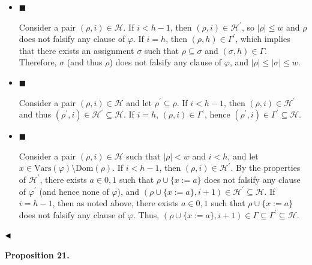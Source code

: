 \documentclass[10pt,a4paper]{article}
\begin{document}
\begin{itemize}


\item 
$\blacksquare$ 


Consider a pair $(\rho,i)\in\mathcal{H}$.
If $i<h-1$, then $(\rho,i)\in\mathcal{H^{\prime}}$, so $|\rho|\leq w$ and $\rho$ does not falsify any clause of $\varphi$.
If $i=h$, then $(\rho,h)\in\Gamma^{\prime}$, which implies that there exists an assignment $\sigma$ such that
$\rho\subseteq\sigma$ and $(\sigma,h)\in\Gamma$.
Therefore, $\sigma$ (and thus $\rho$) does not falsify any clause of $\varphi$, and $|\rho|\leq|\sigma|\leq w$.\par





\item 
$\blacksquare$ 


Consider a pair $(\rho,i)\in\mathcal{H}$ and let $\rho^{\prime}\subseteq\rho$.
If $i<h-1$, then $(\rho,i)\in\mathcal{H^{\prime}}$ and thus $(\rho^{\prime},i)\in\mathcal{H^{\prime}}\subseteq\mathcal{H}$.
If $i=h$, $(\rho,i)\in\Gamma^{\prime}$, hence $(\rho^{\prime},i)\in\Gamma^{\prime}\subseteq\mathcal{H}$.\par





\item 
$\blacksquare$ 


Consider a pair $(\rho,i)\in\mathcal{H}$ such that $|\rho|<w$ and $i<h$, and let $x\in\mathrm{Vars}(\varphi)\setminus\mathrm{Dom}(\rho)$.
If $i<h-1$, then $(\rho,i)\in\mathcal{H^{\prime}}$.
By the properties of $\mathcal{H^{\prime}}$, there exists $a\in{0,1}$ such that $\rho\cup\{x:=a\}$ does not falsify any clause
of $\varphi^{\prime}$ (and hence none of $\varphi$), and $(\rho\cup\{x:=a\},i+1)\in\mathcal{H^{\prime}}\subseteq\mathcal{H}$.
If $i=h-1$, then as noted above, there exists $a\in{0,1}$ such that $\rho\cup\{x:=a\}$ does not falsify any clause
of $\varphi$.
Thus, $(\rho\cup\{x:=a\},i+1)\in\Gamma\subseteq\Gamma^{\prime}\subseteq\mathcal{H}$.\par





\end{itemize}


$\hfill\blacktriangleleft$\par



\par\medskip\noindent\textbf{
Proposition 21.
}\par
\end{document}
